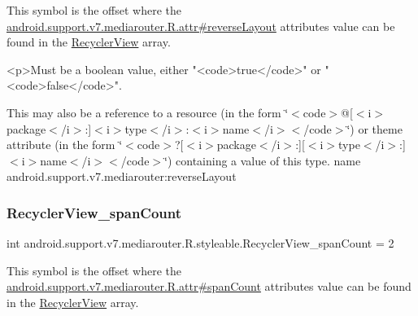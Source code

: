 This symbol is the offset where the \hyperlink{classandroid_1_1support_1_1v7_1_1mediarouter_1_1R_1_1attr_ad202a35ffdff81d10cb206fd09682d56}{android.\+support.\+v7.\+mediarouter.\+R.\+attr\#reverse\+Layout} attribute\textquotesingle{}s value can be found in the \hyperlink{classandroid_1_1support_1_1v7_1_1mediarouter_1_1R_1_1styleable_af634dfe19333cdc00d399d1f00635e93}{Recycler\+View} array.

\begin{DoxyVerb}      <p>Must be a boolean value, either "<code>true</code>" or "<code>false</code>".
\end{DoxyVerb}
 

This may also be a reference to a resource (in the form \char`\"{}$<$code$>$@\mbox{[}$<$i$>$package$<$/i$>$\+:\mbox{]}$<$i$>$type$<$/i$>$\+:$<$i$>$name$<$/i$>$$<$/code$>$\char`\"{}) or theme attribute (in the form \char`\"{}$<$code$>$?\mbox{[}$<$i$>$package$<$/i$>$\+:\mbox{]}\mbox{[}$<$i$>$type$<$/i$>$\+:\mbox{]}$<$i$>$name$<$/i$>$$<$/code$>$\char`\"{}) containing a value of this type.  name android.\+support.\+v7.\+mediarouter\+:reverse\+Layout \mbox{\label{classandroid_1_1support_1_1v7_1_1mediarouter_1_1R_1_1styleable_ac4cd1f480c58b2a594180fd85c5007ae}} 
\subsubsection{\texorpdfstring{Recycler\+View\+\_\+span\+Count}{RecyclerView\_spanCount}}
{\footnotesize\ttfamily int android.\+support.\+v7.\+mediarouter.\+R.\+styleable.\+Recycler\+View\+\_\+span\+Count = 2\hspace{0.3cm}{\ttfamily [static]}}

This symbol is the offset where the \hyperlink{classandroid_1_1support_1_1v7_1_1mediarouter_1_1R_1_1attr_aaacd26dca5bbd7b54e2c2036015d289f}{android.\+support.\+v7.\+mediarouter.\+R.\+attr\#span\+Count} attribute\textquotesingle{}s value can be found in the \hyperlink{classandroid_1_1support_1_1v7_1_1mediarouter_1_1R_1_1styleable_af634dfe19333cdc00d399d1f00635e93}{Recycler\+View} array.

